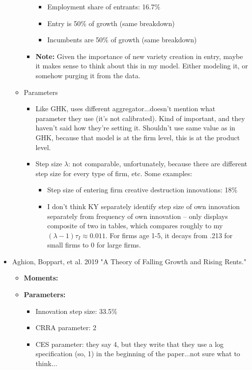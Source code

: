 \documentclass[12pt,english]{article}
\theoremstyle{remark}
\begin{document}
\begin{itemize}
\begin{itemize}
\begin{itemize}
			\begin{itemize}
				\item Employment share of entrants: 16.7\%
				\item Entry is 50\% of growth (same breakdown)
				\item Incumbents are 50\% of growth (same breakdown)
			\end{itemize}
			\item \textbf{Note:} Given the importance of new variety creation in entry, maybe it makes sense to think about this in my model. Either modeling it, or somehow purging it from the data. 
		\end{itemize}
		\item Parameters
		\begin{itemize}
			\item Like GHK, uses different aggregator...doesn't mention what parameter they use (it's not calibrated). Kind of important, and they haven't said how they're setting it. Shouldn't use same value as in GHK, because that model is at the firm level, this is at the product level.
			\item Step size $\lambda$: not comparable, unfortunately, because there are different step size for every type of firm, etc. Some examples:
			\begin{itemize}
				\item Step size of entering firm creative destruction innovations: 18\%
				\item I don't think KY separately identify step size of own innovation separately from frequency of own innovation -- only displays composite of two in tables, which compares roughly to my $(\lambda -1)\tau_I \approx 0.011$. For firms age 1-5, it decays from .213 for small firms to 0 for large firms.
			\end{itemize}
		\end{itemize}
	\end{itemize}
	\item Aghion, Boppart, et al. 2019 "A Theory of Falling Growth and Rising Rents."
	\begin{itemize}
		\item \textbf{Moments:}
		\item \textbf{Parameters:}
		\begin{itemize}
			\item Innovation step size: 33.5\% 
			\item CRRA parameter: 2
			\item CES parameter: they say 4, but they write that they use a log specification (so, 1) in the beginning of the paper...not sure what to think...

\end{itemize}
\end{itemize}
\end{itemize}
\end{document}
